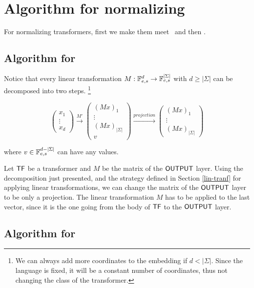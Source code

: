 \chapter{Algorithm for normalizing}\label{appendix:alg-norm}

For normalizing transformers, first we make them meet \projection\ and then \concentrated.

\section*{Algorithm for \projection}

Notice that every linear transformation $M: \mathbb{F}_{e,s}^d \to \mathbb{F}_{e,s}^{|\Sigma|}$ with $d \geq |\Sigma|$ can be decomposed into two steps. 
\footnote{We can always add more coordinates to the embedding if $d < |\Sigma|$. Since the language is fixed, it will be a constant number of coordinates, thus not changing the class of the transformer.}

\[
    \left( \begin{matrix} x_1    \\ \vdots \\ x_d    \end{matrix} \right) 
    \xrightarrow{M'}
    \left( \begin{matrix} (Mx)_1 \\ \vdots \\ (Mx)_{|\Sigma|} \\ v \end{matrix} \right)
    \xrightarrow{projection}
    \left( \begin{matrix} (Mx)_1 \\ \vdots \\ (Mx)_{|\Sigma|} \end{matrix} \right)
\]

\noindent where $v \in \mathbb{F}_{e,s}^{d-|\Sigma|}$ can have any values.

Let $\mathsf{TF}$ be a transformer and $M$ be the matrix of the $\mathsf{OUTPUT}$ layer.
Using the decomposition just presented, and the strategy defined in Section \ref{lin-tranf} for applying linear transformations, we can change the matrix of the $\mathsf{OUTPUT}$ layer to be only a projection.
The linear transformation $M$ has to be applied to the last vector, since it is the one going from the body of $\mathsf{TF}$ to the $\mathsf{OUTPUT}$ layer. 

\medskip

\section*{Algorithm for \concentrated}

